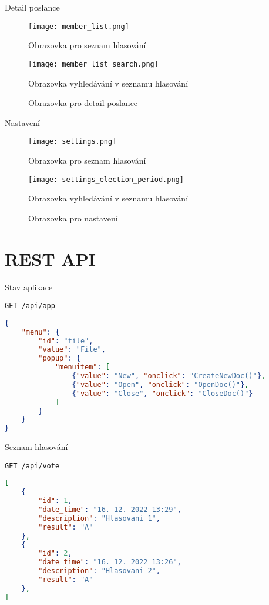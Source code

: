 Detail poslance

\begin{figure}[h]
	\begin{minipage}{0.5\textwidth}
		\centering
		\texttt{[image: member\_list.png]}
		\caption{Obrazovka pro seznam hlasování}
	\end{minipage}%
	\begin{minipage}{0.5\textwidth}
		\centering
		\texttt{[image: member\_list\_search.png]}
		\caption{Obrazovka vyhledávání v seznamu hlasování}
	\end{minipage}
	\caption{Obrazovka pro detail poslance}
\end{figure}

Nastavení

\begin{figure}[h]
	\begin{minipage}{0.5\textwidth}
		\centering
		\texttt{[image: settings.png]}
		\caption{Obrazovka pro seznam hlasování}
	\end{minipage}%
	\begin{minipage}{0.5\textwidth}
		\centering
		\texttt{[image: settings\_election\_period.png]}
		\caption{Obrazovka vyhledávání v seznamu hlasování}
	\end{minipage}
	\caption{Obrazovka pro nastavení}
\end{figure}

\section{REST API}

Stav aplikace

\begin{lstlisting}[]
GET /api/app
\end{lstlisting}

\begin{lstlisting}[language=json,firstnumber=1,tabsize=2]
{
	"menu": {
		"id": "file",
		"value": "File",
		"popup": {
			"menuitem": [
				{"value": "New", "onclick": "CreateNewDoc()"},
				{"value": "Open", "onclick": "OpenDoc()"},
				{"value": "Close", "onclick": "CloseDoc()"}
			]
		}
	}
}
\end{lstlisting}

Seznam hlasování

\begin{lstlisting}[]
GET /api/vote
\end{lstlisting}

\begin{lstlisting}[language=json,firstnumber=1,tabsize=2]
[
	{
		"id": 1,
		"date_time": "16. 12. 2022 13:29",
		"description": "Hlasovani 1",
		"result": "A"
	},
	{
		"id": 2,
		"date_time": "16. 12. 2022 13:26",
		"description": "Hlasovani 2",
		"result": "A"
	},
]
\end{lstlisting}


